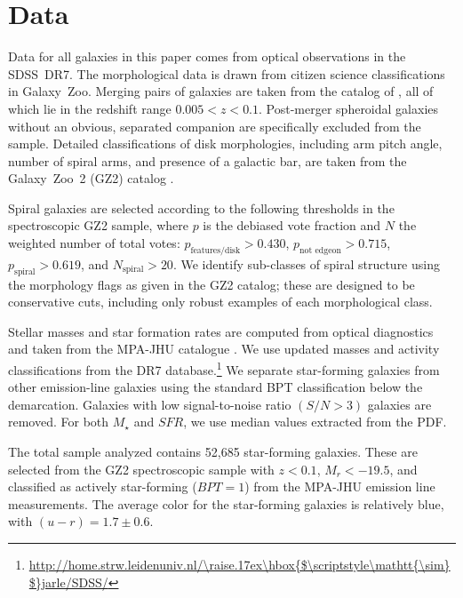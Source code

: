 \documentclass{emulateapj}
\newcommand{\mytilde}{\raise.17ex\hbox{$\scriptstyle\mathtt{\sim}$}}
\begin{document}

\section{Data} \label{sec-data}

Data for all galaxies in this paper comes from optical observations in the SDSS~DR7. The morphological data is drawn from citizen science classifications in Galaxy~Zoo. Merging pairs of galaxies are taken from the catalog of \citet{dar10a}, all of which lie in the redshift range $0.005<z<0.1$. Post-merger spheroidal galaxies without an obvious, separated companion are specifically excluded from the sample. Detailed classifications of disk morphologies, including arm pitch angle, number of spiral arms, and presence of a galactic bar, are taken from the Galaxy~Zoo~2 (GZ2) catalog \citep{wil13}. 

Spiral galaxies are selected according to the following thresholds in the spectroscopic GZ2 sample, where $p$ is the debiased vote fraction and $N$ the weighted number of total votes: $p_\textrm{features/disk} > 0.430$, $p_\textrm{not~edgeon} > 0.715$, $p_\textrm{spiral}>0.619$, and $N_\textrm{spiral}>20$. We identify sub-classes of spiral structure using the morphology flags as given in the GZ2 catalog; these are designed to be conservative cuts, including only robust examples of each morphological class. 

Stellar masses and star formation rates are computed from optical diagnostics and taken from the MPA-JHU catalogue \citep{kau03a,bri04,sal07}. We use updated masses and activity classifications from the DR7 database.\footnote{\url{http://home.strw.leidenuniv.nl/\mytilde jarle/SDSS/}} We separate star-forming galaxies from other emission-line galaxies using the standard BPT classification \citep{bal81} below the \citet{kau03} demarcation. Galaxies with low signal-to-noise ratio $(S/N > 3)$ galaxies are removed. For both $M_\star$ and $SFR$, we use median values extracted from the PDF.

The total sample analyzed contains 52,685 star-forming galaxies. These are selected from the GZ2 spectroscopic sample with $z<0.1$, $M_r<-19.5$, and classified as actively star-forming ($BPT=1$) from the MPA-JHU emission line measurements. The average color for the star-forming galaxies is relatively blue, with $(u-r)=1.7\pm0.6$. 
\end{document}
